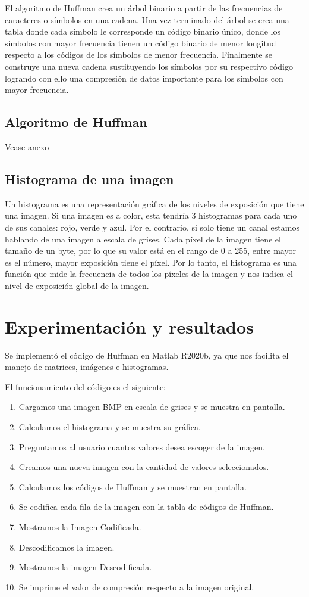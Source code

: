\documentclass[12pt,twoside]{article}
\begin{document}
    El algoritmo de Huffman crea un árbol binario a partir de las frecuencias de caracteres o símbolos en una cadena. Una vez terminado del árbol se crea una tabla donde cada símbolo le corresponde un código binario único, donde los símbolos con mayor frecuencia tienen un código binario de menor longitud respecto a los códigos de los símbolos de menor frecuencia. Finalmente se construye una nueva cadena sustituyendo los símbolos por su respectivo código logrando con ello una compresión de datos importante para los símbolos con mayor frecuencia.
    \subsection{Algoritmo de Huffman}
        \hyperlink{Anexo}{\large{Vease anexo}}
    \subsection{Histograma de una imagen}
    Un histograma es una representación gráfica de los niveles de exposición que tiene una imagen. Si una imagen es a color, esta tendría 3 histogramas para cada uno de sus canales: rojo, verde y azul. Por el contrario, si solo tiene un canal estamos hablando de una imagen a escala de grises.
    Cada píxel de la imagen tiene el tamaño de un byte, por lo que su valor está en el rango de 0 a 255, entre mayor es el número, mayor exposición tiene el píxel. Por lo tanto, el histograma es una función que mide la frecuencia de todos los píxeles de la imagen y nos indica el nivel de exposición global de la imagen.
    \section{Experimentaci\'on y resultados}
    Se implementó el código de Huffman en Matlab R2020b, ya que nos facilita el manejo de matrices, imágenes e histogramas.
    
    El funcionamiento del código es el siguiente:
    \begin{enumerate}
    \item Cargamos una imagen BMP en escala de grises y se muestra en pantalla.
    \item Calculamos el histograma y se muestra su gráfica.
    \item Preguntamos al usuario cuantos valores desea escoger de la imagen.
    \item Creamos una nueva imagen con la cantidad de valores seleccionados.
    \item Calculamos los códigos de Huffman y se muestran en pantalla.
    \item Se codifica cada fila de la imagen con la tabla de códigos de Huffman.
    \item Mostramos la Imagen Codificada.
    \item Descodificamos la imagen.
    \item Mostramos la imagen Descodificada.
    \item Se imprime el valor de compresión respecto a la imagen original.
    \end{enumerate}
    
\end{document}

